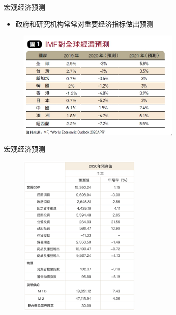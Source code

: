 \begin{frame}{宏观经济预测}
  \begin{itemize}
    \item
    政府和研究机构常常对重要经济指标做出预测
  \end{itemize}
\begin{figure}[H]
  \includegraphics[width=8cm]{pics/predict-demo.jpeg}
\end{figure}
\end{frame}

\begin{frame}{宏观经济预测}

\begin{figure}[H]
  \includegraphics[width=6cm]{pics/predict-demo2.jpeg}
\end{figure}

\end{frame}


